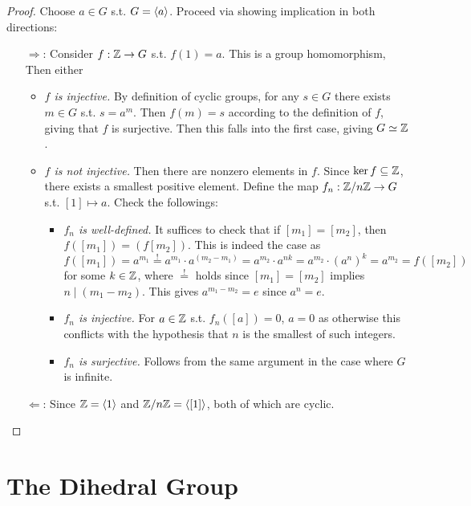 \documentclass{article}
\begin{document}
\begin{proof}
    Choose $a \in G$ s.t. $G = \left\langle a \right\rangle$. Proceed via showing implication in both directions:
    \begin{enumerate}
        \item[$\Rightarrow$:] Consider $f: \mathbb{Z} \to G$ s.t. $f(1) = a$. This is a group homomorphism,  Then either
        \begin{itemize}
            \item \emph{$f$ is injective.} By definition of cyclic groups, for any $s \in G$ there exists $m \in G$ s.t. $s = a^m$. Then $f(m) = s$ according to the definition of $f$, giving that $f$ is surjective. Then this falls into the first case, giving $G \simeq \mathbb{Z}$.
            \item \emph{$f$ is not injective.} Then there are nonzero elements in $f$. Since $\ker f \subseteq \mathbb{Z}$, there exists a smallest positive element. Define the map $f_n: \mathbb{Z}/n\mathbb{Z} \to G$ s.t. $[1] \mapsto a$. Check the followings:
            \begin{itemize}
                \item \emph{$f_n$ is well-defined.} It suffices to check that if $[m_1] = [m_2]$, then $f([m_1]) = (f[m_2])$. This is indeed the case as
                \[
                    f([m_1]) = a^{m_1} \overset{!}{=} a^{m_1} \cdot a^{(m_2 - m_1)} = a^{m_2} \cdot a^{nk} = a^{m_2} \cdot (a^n)^k = a^{m_2} = f([m_2])
                \]
                for some $k \in \mathbb{Z}$, where $\overset{!}{=}$ holds since $[m_1] = [m_2]$ implies $n \mid (m_1 - m_2)$. This gives $a^{m_1 - m_2} = e$ since $a^n = e$. 
                \item \emph{$f_n$ is injective.} For $a \in \mathbb{Z}$ s.t. $f_n([a]) = 0$, $a = 0$ as otherwise this conflicts with the hypothesis that $n$ is the smallest of such integers. 
                \item \emph{$f_n$ is surjective.} Follows from the same argument in the case where $G$ is infinite.
            \end{itemize}
        \end{itemize}
        \item[$\Leftarrow$:] Since $\mathbb{Z} = \left\langle 1 \right\rangle$ and $\mathbb{Z}/n\mathbb{Z} = \left\langle [1] \right\rangle$, both of which are cyclic. 
    \end{enumerate}
\end{proof}

\section{The Dihedral Group}
\end{document}
